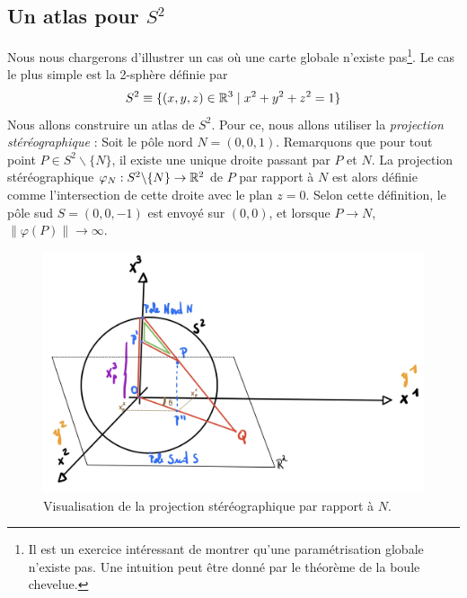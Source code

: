 \subsection{Un atlas pour $S^2$}
Nous nous chargerons d'illustrer un cas où une carte globale n'existe pas\footnote{Il est un exercice intéressant de montrer qu'une paramétrisation globale n'existe pas. Une intuition peut être donné par le théorème de la boule chevelue.}. Le cas le plus simple est la 2-sphère définie par 
\begin{equation}
    S^2 \equiv \{ (x,y,z) \in \mathbb{R}^3 \mid x^2+y^2+z^2 = 1\}
\end{equation}
Nous allons construire un atlas de $S^2$. Pour ce, nous allons utiliser la \emph{projection stéréographique} : Soit le pôle nord $N = (0,0,1)$. Remarquons que pour tout point $P\in S^2\backslash \{N\}$, il existe une unique droite passant par $P$ et $N$. La projection stéréographique $\varphi_N:S^2\backslash\{N\} \to \mathbb{R}^2$ de $P$ par rapport à $N$ est alors définie comme l'intersection de cette droite avec le plan $z=0$. Selon cette définition, le pôle sud $S = (0,0,-1)$ est envoyé sur $(0,0)$, et lorsque $P \to N$, $\lVert \varphi(P) \lVert \to \infty$.

\begin{figure}[H]
    \centering
    \includegraphics[width=0.7\linewidth]{Chapitres/3.Element de géométrie différentielle/Images/sphère S^2.jpg}
    \caption{Visualisation de la projection stéréographique par rapport à $N$.}
    \label{fig:stereographique 1}
\end{figure}

